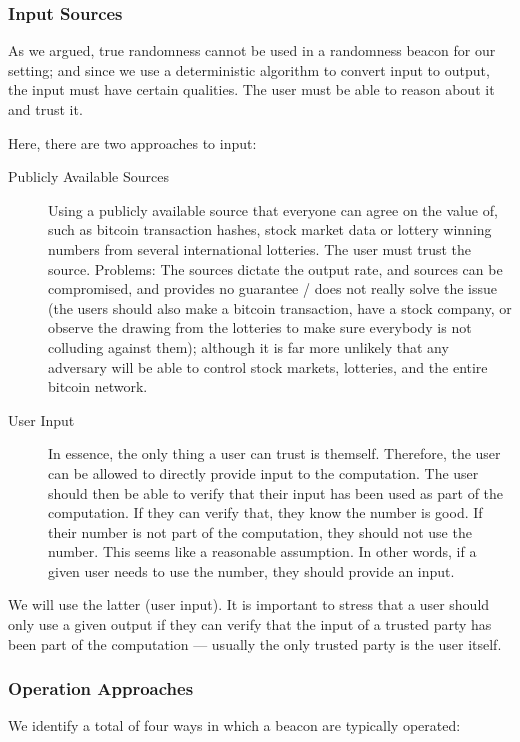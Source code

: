 \subsubsection{Input Sources}
As we argued, true randomness cannot be used in a randomness beacon for our setting;
and since we use a deterministic algorithm to convert input to output, the input must have certain qualities.
The user must be able to reason about it and trust it.

Here, there are two approaches to input:

\begin{description}
    \item[Publicly Available Sources] Using a publicly available source that everyone can agree on the value of, such as bitcoin transaction hashes, stock market data or lottery winning numbers from several international lotteries.
The user must trust the source.
Problems: The sources dictate the output rate, and sources can be compromised, and provides no guarantee / does not really solve the issue (the users should also make a bitcoin transaction, have a stock company, or observe the drawing from the lotteries to make sure everybody is not colluding against them); although it is far more unlikely that any adversary will be able to control stock markets, lotteries, and the entire bitcoin network.

    \item[User Input] In essence, the only thing a user can trust is themself.
Therefore, the user can be allowed to directly provide input to the computation.
The user should then be able to verify that their input has been used as part of the computation.
If they can verify that, they know the number is good.
If their number is not part of the computation, they should not use the number.
This seems like a reasonable assumption.
In other words, if a given user needs to use the number, they should provide an input.
\end{description}

We will use the latter (user input).
It is important to stress that a user should only use a given output if they can verify that the input of a trusted party has been part of the computation --- usually the only trusted party is the user itself.

\subsubsection{Operation Approaches}
We identify a total of four ways in which a beacon are typically operated:

